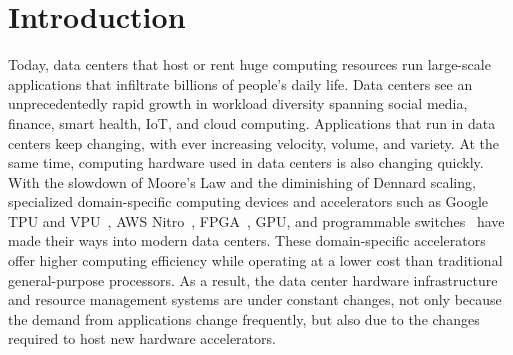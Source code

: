 \chapter{Introduction}

\fi

Today, data centers that host or rent huge computing resources
run large-scale applications that infiltrate billions of people's daily life.
Data centers see an unprecedentedly rapid growth in workload diversity spanning social media, finance, smart health, IoT, and cloud computing.
Applications that run in data centers keep changing, with ever increasing velocity, volume, and variety.
%
At the same time, computing hardware used in data centers is also changing quickly.
With the slowdown of Moore's Law and the diminishing of Dennard scaling, 
specialized domain-specific computing devices and accelerators
such as Google TPU and VPU~\cite{TPU,VPU}, AWS Nitro~\cite{aws-nitro}, FPGA~\cite{Catapult}, GPU, and programmable switches~\cite{hpcc-sigcomm19} have made their ways into modern data centers.
These domain-specific accelerators offer higher computing efficiency
while operating at a lower cost than traditional general-purpose processors.
%
As a result, the data center hardware infrastructure and resource management systems are under constant changes, not only because the demand from applications change frequently, but also due to the changes required to host new hardware accelerators.


